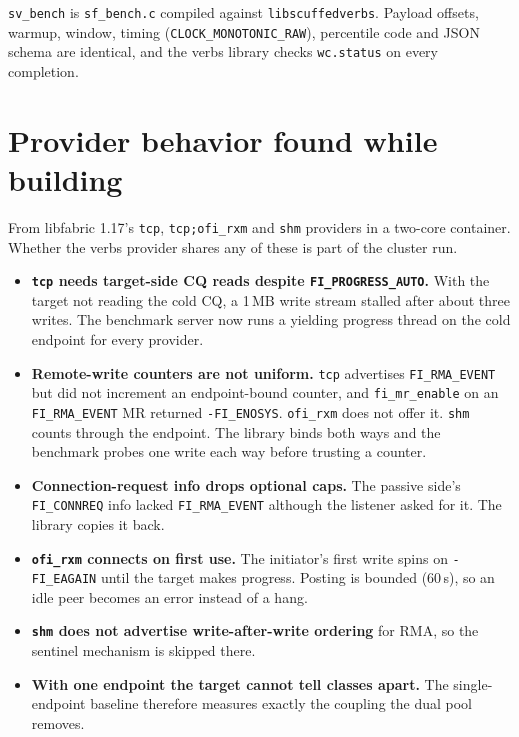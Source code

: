 \documentclass[11pt,letterpaper]{article}
\begin{document}
\texttt{sv\_bench} is \texttt{sf\_bench.c} compiled against \texttt{libscuffedverbs}. Payload offsets, warmup, window, timing (\texttt{CLOCK\_MONOTONIC\_RAW}), percentile code and JSON schema are identical, and the verbs library checks \texttt{wc.status} on every completion.

\section{Provider behavior found while building}

From libfabric 1.17's \texttt{tcp}, \texttt{tcp;ofi\_rxm} and \texttt{shm} providers in a two-core container. Whether the verbs provider shares any of these is part of the cluster run.

\begin{itemize}
\item \textbf{\texttt{tcp} needs target-side CQ reads despite \texttt{FI\_PROGRESS\_AUTO}.} With the target not reading the cold CQ, a 1\,MB write stream stalled after about three writes. The benchmark server now runs a yielding progress thread on the cold endpoint for every provider.
\item \textbf{Remote-write counters are not uniform.} \texttt{tcp} advertises \texttt{FI\_RMA\_EVENT} but did not increment an endpoint-bound counter, and \texttt{fi\_mr\_enable} on an \texttt{FI\_RMA\_EVENT} MR returned \texttt{-FI\_ENOSYS}. \texttt{ofi\_rxm} does not offer it. \texttt{shm} counts through the endpoint. The library binds both ways and the benchmark probes one write each way before trusting a counter.
\item \textbf{Connection-request info drops optional caps.} The passive side's \texttt{FI\_CONNREQ} info lacked \texttt{FI\_RMA\_EVENT} although the listener asked for it. The library copies it back.
\item \textbf{\texttt{ofi\_rxm} connects on first use.} The initiator's first write spins on \texttt{-FI\_EAGAIN} until the target makes progress. Posting is bounded (60\,s), so an idle peer becomes an error instead of a hang.
\item \textbf{\texttt{shm} does not advertise write-after-write ordering} for RMA, so the sentinel mechanism is skipped there.
\item \textbf{With one endpoint the target cannot tell classes apart.} The single-endpoint baseline therefore measures exactly the coupling the dual pool removes.
\end{itemize}
\end{document}

